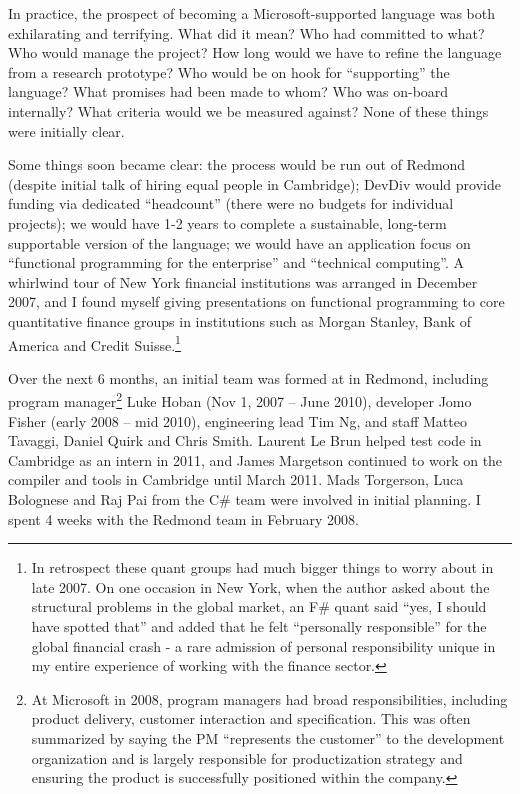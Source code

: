 \documentclass[acmsmall]{acmart}\settopmatter{}
\begin{document}
In practice, the prospect of becoming a Microsoft-supported language was both exhilarating and terrifying. What did
it mean? Who had committed to what?  Who would manage the project? How long would we have to refine the
language from a research prototype?  Who would be on hook for “supporting” the language? What promises
had been made to whom? Who was on-board internally? What criteria would we be measured against?  None of these things were initially clear.  

Some things soon became clear: the process would be run out of Redmond (despite initial talk of hiring equal people in
Cambridge); DevDiv would provide funding via dedicated “headcount” (there were no budgets for individual projects); we
would have 1-2 years to complete a sustainable, long-term supportable version of the language; we would have an
application focus on “functional programming for the enterprise” and “technical computing”. A whirlwind tour of New York
financial institutions was arranged in December 2007, and I found myself giving presentations on functional programming
to core quantitative finance groups in institutions such as Morgan Stanley, Bank of America and
Credit Suisse.\footnote{ In retrospect these quant groups had much bigger things to worry about in
late 2007. On one occasion in New York, when the author asked about the structural problems in the
global market, an F\# quant said “yes, I should have spotted that” and added that he felt “personally
responsible” for the global financial crash - a rare admission of personal responsibility unique in my entire
experience of working with the finance sector.}

Over the next 6 months, an initial team was formed at in Redmond, including program
manager\footnote{At Microsoft in 2008, program managers had broad responsibilities, including product delivery,
customer interaction and specification. This was often summarized by saying the PM “represents the customer” to
the development organization and is largely responsible for productization strategy and ensuring the product is
successfully positioned within the company.} Luke Hoban  (Nov 1, 2007 – June 2010), developer
Jomo Fisher (early 2008 – mid 2010), engineering lead Tim Ng, and staff Matteo Tavaggi, Daniel Quirk and
Chris Smith.  Laurent Le Brun helped test code in Cambridge as an intern in 2011, and James Margetson
continued to work on the compiler and tools in Cambridge until March 2011.  Mads Torgerson, Luca Bolognese
and Raj Pai from the C\# team were involved in initial planning. I spent 4 weeks with the Redmond team in February 2008.
\end{document}
